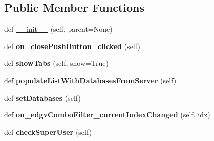 \subsection*{Public Member Functions}
\begin{DoxyCompactItemize}
\item 
def \mbox{\hyperlink{class_dsg_tools_1_1_server_tools_1_1batch_db_manager_1_1_batch_db_manager_ae14db73fe4c994d8a7c4a29f8c4d27cd}{\+\_\+\+\_\+init\+\_\+\+\_\+}} (self, parent=None)
\item 
\mbox{\label{class_dsg_tools_1_1_server_tools_1_1batch_db_manager_1_1_batch_db_manager_ad2a4ac90844c6e5bc2454ee2d9b8689e}} 
def {\bfseries on\+\_\+close\+Push\+Button\+\_\+clicked} (self)
\item 
\mbox{\label{class_dsg_tools_1_1_server_tools_1_1batch_db_manager_1_1_batch_db_manager_ac87c681f6af6b956083a5e10cffe983f}} 
def {\bfseries show\+Tabs} (self, show=True)
\item 
\mbox{\label{class_dsg_tools_1_1_server_tools_1_1batch_db_manager_1_1_batch_db_manager_a86c66c26bb02bbf590c71d48f25d56c6}} 
def {\bfseries populate\+List\+With\+Databases\+From\+Server} (self)
\item 
\mbox{\label{class_dsg_tools_1_1_server_tools_1_1batch_db_manager_1_1_batch_db_manager_ac5d3ca6ef6fb86549f57e427d8663235}} 
def {\bfseries set\+Databases} (self)
\item 
\mbox{\label{class_dsg_tools_1_1_server_tools_1_1batch_db_manager_1_1_batch_db_manager_a74e31d45dfc180b66b69779dd0694085}} 
def {\bfseries on\+\_\+edgv\+Combo\+Filter\+\_\+current\+Index\+Changed} (self, idx)
\item 
\mbox{\label{class_dsg_tools_1_1_server_tools_1_1batch_db_manager_1_1_batch_db_manager_aad062d18b663166dd80686e5d1983209}} 
def {\bfseries check\+Super\+User} (self)
\item 

\end{DoxyCompactItemize}

